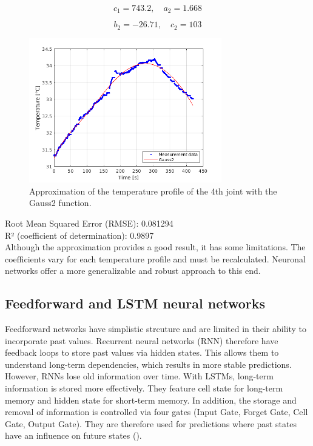 \documentclass{ifacconf}
\begin{document}
\[
c_1 = 743.2, \quad a_2 = 1.668 
\]

\[
b_2 = -26.71, \quad c_2 = 103
\]

\begin{figure}[t]
  \begin{center}
  \includegraphics[width=8.4cm]{pictures/Gauss2_legend.png}    %
  \caption{Approximation of the temperature profile of the 4th joint with the Gauss2 function.} 
  \label{fig:Gauss2_legend}
  \end{center}
\end{figure}
Root Mean Squared Error (RMSE): 0.081294\\
R² (coefficient of determination): 0.9897\\

Although the approximation provides a good result, it has some limitations. 
The coefficients vary for each temperature profile and must be recalculated. 
Neuronal networks offer a more generalizable and robust approach to this end.


\subsection{Feedforward and LSTM neural networks}
Feedforward networks have simplistic strcuture and are limited in their ability to incorporate past values. 
Recurrent neural networks (RNN) therefore have feedback loops to store past values via hidden states. This allows them to understand long-term dependencies, which results in more stable predictions.
However, RNNs lose old information over time. With LSTMs, long-term information is stored more effectively. They feature cell state for long-term memory and hidden state for short-term memory. In addition, the storage and removal of information is controlled via four gates (Input Gate, Forget Gate, Cell Gate, Output Gate).  
They are therefore used for predictions where past states have an influence on future states (\cite{Ljung}).
\end{document}
